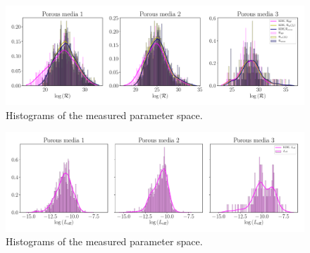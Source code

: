 \documentclass[draft,jgrga]{agutexSI2019}
\begin{document}
\begin{figure}
\noindent\includegraphics[width=15cm]{figures/hydraulic_resistance_integrated_histogram.pdf}
\caption{Histograms of the measured parameter space. }\label{Fig:Hist}
\end{figure}

\begin{figure}
\noindent\includegraphics[width=15cm]{figures/Leff_integrated_histogram.pdf}
\caption{Histograms of the measured parameter space. }\label{Fig:Hist}
\end{figure}



\end{document}
